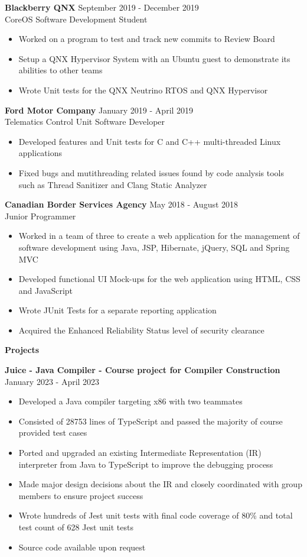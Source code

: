 \documentclass[10pt]{article}
\begin{document}
\textbf{Blackberry QNX}
\hfill September 2019 - December 2019 \\ CoreOS Software Development Student
\begin{itemize}[noitemsep]
    \item Worked on a program to test and track new commits to Review Board
    \item Setup a QNX Hypervisor System with an Ubuntu guest to demonstrate its abilities to other teams
    \item Wrote Unit tests for the QNX Neutrino RTOS and QNX Hypervisor
\end{itemize}

\textbf{Ford Motor Company}
\hfill January 2019 - April 2019 \\ Telematics Control Unit Software Developer
\begin{itemize}[noitemsep]
    \item Developed features and Unit tests for C and C++ multi-threaded Linux applications
    \item Fixed bugs and mutithreading related issues found by code analysis tools such as Thread Sanitizer and Clang Static Analyzer
\end{itemize}

\textbf{Canadian Border Services Agency}
\hfill May 2018 - August 2018 \\ Junior Programmer
\begin{itemize}[noitemsep]
    \item Worked in a team of three to create a web application for the management of software development using Java, JSP, Hibernate, jQuery, SQL and Spring MVC
    \item Developed functional UI Mock-ups for the web application using HTML, CSS and JavaScript
    \item Wrote JUnit Tests for a separate reporting application
    \item Acquired the Enhanced Reliability Status level of security clearance
\end{itemize}

\newpage

{\Large\textbf{Projects}}\space \hrulefill

\textbf{Juice - Java Compiler - Course project for Compiler Construction} \hfill January 2023 - April 2023
\begin{itemize}[noitemsep]
    \item Developed a Java compiler targeting x86 with two teammates
    \item Consisted of 28753 lines of TypeScript and passed the majority of course provided test cases
    \item Ported and upgraded an existing Intermediate Representation (IR) interpreter from Java to TypeScript to improve the debugging process
    \item Made major design decisions about the IR and closely coordinated with group members to ensure project success
    \item Wrote hundreds of Jest unit tests with final code coverage of 80\% and total test count of 628 Jest unit tests
    \item Source code available upon request
\end{itemize}
\end{document}
